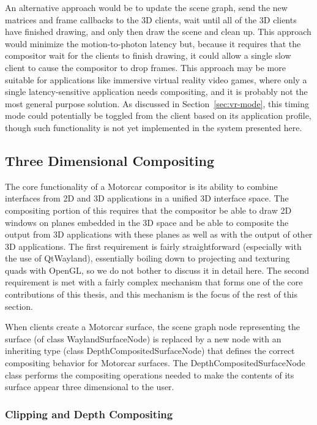 An alternative approach would be to update the scene graph, send the new matrices and frame callbacks to the 3D clients, wait until all of the 3D clients have finished drawing, and only then draw the scene and clean up. This approach would minimize the motion-to-photon latency but, because it requires that the compositor wait for the clients to finish drawing, it could allow a single slow client to cause the compositor to drop frames. This approach may be more suitable for applications like immersive virtual reality video games, where only a single latency-sensitive application needs compositing, and it is probably not the most general purpose solution. As discussed in Section~\ref{sec:vr-mode}, this timing mode could potentially be toggled from the client based on its application profile, though such functionality is not yet implemented in the system presented here.

\subsection{Three Dimensional Compositing}
\label{sec:3d-compositing}

The core functionality of a Motorcar compositor is its ability to combine interfaces from 2D and 3D applications in a unified 3D interface space. The compositing portion of this requires that the compositor be able to draw 2D windows on planes embedded in the 3D space and be able to composite the output from 3D applications with these planes as well as with the output of other 3D applications. The first requirement is fairly straightforward (especially with the use of QtWayland), essentially boiling down to projecting and texturing quads with OpenGL, so we do not bother to discuss it in detail here. The second requirement is met with a fairly complex mechanism that forms one of the core contributions of this thesis, and this mechanism is the focus of the rest of this section.

When clients create a Motorcar surface, the scene graph node representing the surface (of class WaylandSurfaceNode) is replaced by a new node with an inheriting type (class DepthCompositedSurfaceNode)  that defines the correct compositing behavior for Motorcar surfaces. The DepthCompositedSurfaceNode class performs the compositing operations needed to make the contents of its surface appear three dimensional to the user.

\subsubsection{Clipping and Depth Compositing}
\label{sec:clipping-impl}

